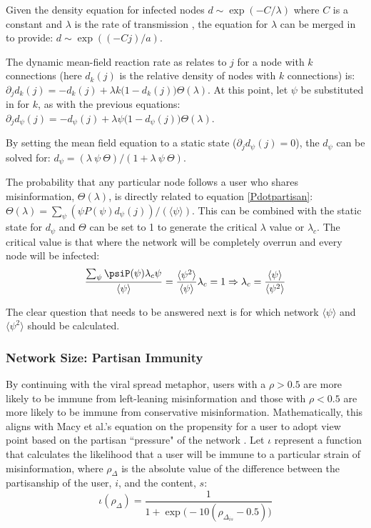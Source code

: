 \documentclass[preprint,review,12pt]{elsarticle}
\begin{document}
Given the density equation for infected nodes $d \sim \exp( - C / \lambda)$ where $C$ is a constant and $\lambda$ is the rate of transmission \cite{pastor2001epidemic}, the equation for $\lambda$ can be merged in to provide: $d \sim \exp((-C j)/ a)$.

The dynamic mean-field reaction rate \cite{marro2005nonequilibrium,pastor2001dynamics,pastor2001epidemic} as relates to $j$ for a node with $k$ connections (here $d_k(j)$ is the relative density of nodes with $k$ connections) is: $\partial_jd_k(j) = - d_k(j) + \lambda k \big(1 - d_k(j)\big)\Theta(\lambda)$. At this point, let $\psi$ be substituted in for $k$, as with the previous equations: $\partial_jd_{\psi}(j) = - d_{\psi}(j) + \lambda \psi \big(1 - d_{\psi}(j)\big)\Theta(\lambda)$.

By setting the mean field equation to a static state ($\partial_jd_{\psi}(j) = 0$), the $d_{\psi}$ can be solved for: $d_{\psi} = (\lambda \ \psi \ \Theta)/(1 + \lambda \ \psi \ \Theta)$.

The probability that any particular node follows a user who shares misinformation, $\Theta(\lambda)$, is directly related to equation \ref{Pdotpartisan}: $\Theta(\lambda) = \sum_{\psi} (\psi P(\psi)d_{\psi}(j)) / (\langle \psi \rangle)$. This can be combined with the static state for $d_{\psi}$ and $\Theta$ can be set to 1 to generate the critical $\lambda$ value or $\lambda_c$. The critical value is that where the network will be completely overrun and every node will be infected: 
\begin{equation}
\label{critical value equation}
    \frac{\sum_{\psi} \psiP(\psi)\lambda_c\psi}{\langle \psi \rangle} = \frac{\langle \psi^2 \rangle}{\langle \psi \rangle}\lambda_c = 1 \Rightarrow \lambda_c = \frac{\langle \psi \rangle}{\langle \psi^2 \rangle}
\end{equation}

The clear question that needs to be answered next is for which network $\langle \psi \rangle$ and $\langle \psi^2 \rangle$ should be calculated. 

\subsubsection{Network Size: Partisan Immunity}
By continuing with the viral spread metaphor, users with a $\rho > 0.5$ are more likely to be immune from left-leaning misinformation and those with  $\rho < 0.5$ are more likely to be immune from conservative misinformation. Mathematically, this aligns with Macy et al.'s equation on the propensity for a user to adopt view point based on the partisan ``pressure" of the network \cite{macy2003polarization}. Let $\iota$ represent a function that calculates the likelihood that a user will be immune to a particular strain of misinformation, where $\rho_{\Delta}$ is the absolute value of the difference between the partisanship of the user, $i$, and the content, $s$:
\begin{equation}
\label{immunity equation}
    \iota(\rho_{\Delta})=\frac{1}{1+\exp{\big(-10 (\rho_{\Delta_{is}}-0.5)\big)}}
\end{equation}
\end{document}
